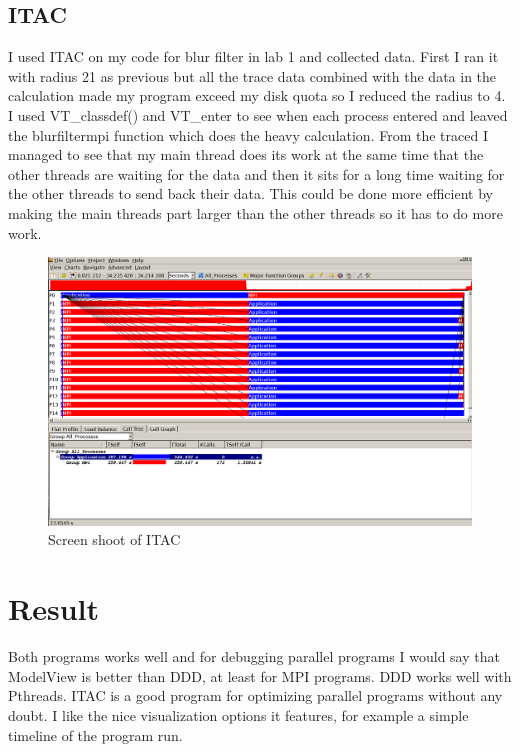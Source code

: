 \documentclass[10pt,twocolumn]{article}
\begin{document}
\subsection{ITAC}
I used ITAC on my code for blur filter in lab 1 and collected data. First I ran it with radius 21 as previous but all the trace data combined with the data in the calculation made my program exceed my disk quota so I reduced the radius to 4. I used VT\_classdef() and VT\_enter{} to see when each process entered and leaved the blurfiltermpi function which does the heavy calculation. From the traced I managed to see that my main thread does its work at the same time that the other threads are waiting for the data and then it sits for a long time waiting for the other threads to send back their data. This could be done more efficient by making the main threads part larger than the other threads so it has to do more work. 
\begin{figure}[H]
	\begin{center}
		\includegraphics[scale=0.13]{figurer/screen2.png}
	\end{center}
	\caption{Screen shoot of ITAC}
\end{figure}

\section{Result}
Both programs works well and for debugging parallel programs I would say that ModelView is better than DDD, at least for MPI programs. DDD works well with Pthreads. ITAC is a good program for optimizing parallel programs without any doubt. I like the nice visualization options it features, for example a simple timeline of the program run. 
\end{document}
